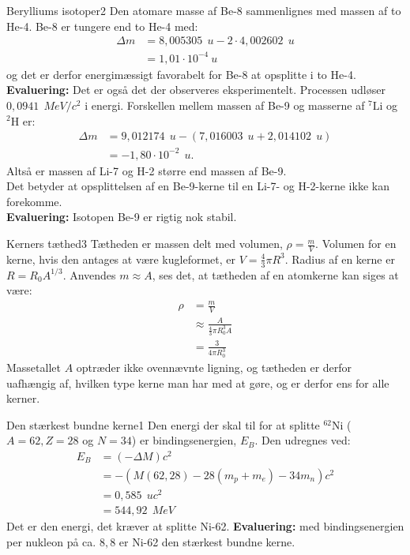 \begin{opgave}{Berylliums isotoper}{2}
\opg Den atomare masse af Be-8 sammenlignes med massen af to He-4.  Be-8 er tungere end to He-4 med:
\begin{align*}
\Delta m &= 8,005305~\SI{}{u} - 2\cdot 4,002602~\SI{}{u}  \\
&=1,01 \cdot 10^{-4}\SI{}{u}
\end{align*}
og det er derfor energimæssigt favorabelt for Be-8 at opsplitte i to He-4.\\
\textbf{Evaluering:} Det er også det der observeres eksperimentelt. Processen udløser $0,0941~\SI{}{MeV/c^2}$ i energi.
\opg Forskellen mellem massen af Be-9 og masserne af $^7\text{Li}$ og $^2\text{H}$ er:
\begin{align*}
\Delta m &= 9,012174~\SI{}{u} - (7,016003~\SI{}{u} + 2,014102~\SI{}{u}) \\
&=-1,80 \cdot 10^{-2}~\SI{}{u}.
\end{align*}
Altså er massen af Li-7 og H-2 større end massen af Be-9.\\
Det betyder at opsplittelsen af en Be-9-kerne til en Li-7- og H-2-kerne ikke kan forekomme.\\
\textbf{Evaluering:} Isotopen Be-9 er rigtig nok stabil. 
\end{opgave}

\begin{opgave}{Kerners tæthed}{3}
Tætheden er massen delt med volumen, $\rho=\frac{m}{V}$. Volumen for en kerne, hvis den antages at være kugleformet, er $V=\frac{4}{3} \pi R^3$. Radius af en kerne er $R=R_0 A^{1/3}$. Anvendes $m\approx A$, ses det, at tætheden af en atomkerne kan siges at være:
\begin{align*}
\rho &= \frac{m}{V} \\
&\approx \frac{A}{\frac{4}{3} \pi R_0^3 A} \\
&= \frac{3}{4 \pi R_0^3}
\end{align*}
Massetallet $A$ optræder ikke ovennævnte ligning, og tætheden er derfor uafhængig af, hvilken type kerne man har med at gøre, og er derfor ens for alle kerner.
\end{opgave}

\begin{opgave}{Den stærkest bundne kerne}{1}
\label{opg:nickel}
Den energi der skal til for at splitte $^{62}\text{Ni}$ ($A=62, Z=28$ og $N=34$) er bindingsenergien, $E_B$. Den udregnes ved:
\begin{align*}
E_B &= (-\Delta M )c^2 \\
&= - (M(62,28)-28(m_p + m_e) - 34m_n)c^2 \\
&= 0,585~\SI{}{u}c^2 \\
&= 544,92~\SI{}{MeV}
\end{align*}
Det er den energi, det kræver at splitte Ni-62.
\textbf{Evaluering:} med bindingsenergien per nukleon på ca. $8,8$ er Ni-62 den stærkest bundne kerne.
\end{opgave}


